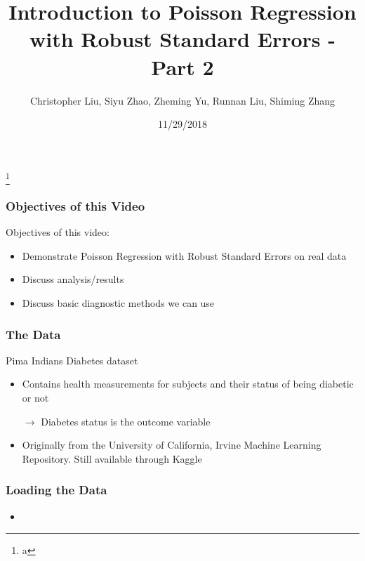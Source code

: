\documentclass{beamer}
\title{Introduction to Poisson Regression with Robust Standard Errors - Part 2}
\author{Christopher Liu, Siyu Zhao, Zheming Yu, Runnan Liu, Shiming Zhang}
\institute{San Diego State University, Stats 610}
\date{11/29/2018}
\begin{document}
	

\begin{frame}[plain]

	\titlepage
	
	\footnote{a}

\end{frame}



\begin{frame}[fragile]\frametitle{Objectives of this Video}
	
	Objectives of this video:	
	
	\begin{itemize}
	
		\item Demonstrate Poisson Regression with Robust Standard Errors on real data
		
		\item Discuss analysis/results
		
		\item Discuss basic diagnostic methods we can use

	\end{itemize}
	
\end{frame}



\begin{frame}[fragile]\frametitle{The Data}

	Pima Indians Diabetes dataset
	
	\begin{itemize}
	
		\item Contains health measurements for subjects and their status of being diabetic or not
		
		$ \rightarrow $ Diabetes status is the outcome variable 
		
		\item Originally from the University of California, Irvine Machine Learning Repository. Still available through Kaggle

	\end{itemize}

\end{frame}



\begin{frame}[fragile]\frametitle{Loading the Data}

	
	\begin{itemize}
	
		\item 

	\end{itemize}

\end{frame}
\end{document}
